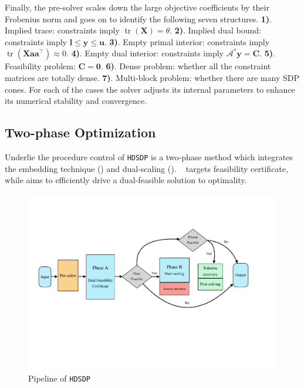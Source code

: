 
Finally, the pre-solver scales down the large objective coefficients by their Frobenius norm and goes on to identify the following seven structures. {\textbf{1)}}. Implied trace: constraints imply
$\ensuremath{\operatorname{tr}} ( \mathbf{X} ) = \theta$. {\textbf{2)}}. Implied dual bound:
constraints imply $\mathbf{l} \leq \mathbf{y} \leq \mathbf{u}$. {\textbf{3)}}. Empty
primal interior: constraints imply $\ensuremath{\operatorname{tr}} ( \mathbf{X} \mathbf{a} \mathbf{a}^{\top}
) \approx 0$. {\textbf{4)}}. Empty dual interior: constraints imply
$\mathcal{A}^{*} \mathbf{y} = \mathbf{C}$. {\textbf{5)}}. Feasibility problem: $\mathbf{C} = \textbf{0}$. {\textbf{6)}}. Dense problem: whether all the constraint matrices are totally dense.
{\textbf{7)}}. Multi-block problem: whether there are many SDP cones. For each of the cases the solver adjusts its internal parameters to enhance its numerical stability and convergence.

\subsection{Two-phase Optimization}

Underlie the procedure control of {{\texttt{HDSDP}}} is a two-phase method which integrates the
embedding technique () and dual-scaling (). \
 targets feasibility certificate, while  aims to efficiently drive a dual-feasible solution to optimality.

\begin{figure}[h]
\centering
\includegraphics[scale=0.45]{fig.pdf}
  \caption{Pipeline of {{\texttt{HDSDP}}}}
\end{figure}


